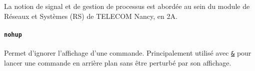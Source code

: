  La notion de signal et de gestion de processus est abordée au sein du module de Réseaux et Systèmes (RS) de TELECOM Nancy, en 2A. 

\paragraph{\texttt{nohup}} 
Permet d'ignorer l'affichage d'une commande. Principalement utilisé avec \hyperref[cmd:fork]{\texttt{\&}} pour lancer une commande en arrière plan sans être perturbé par son affichage.
